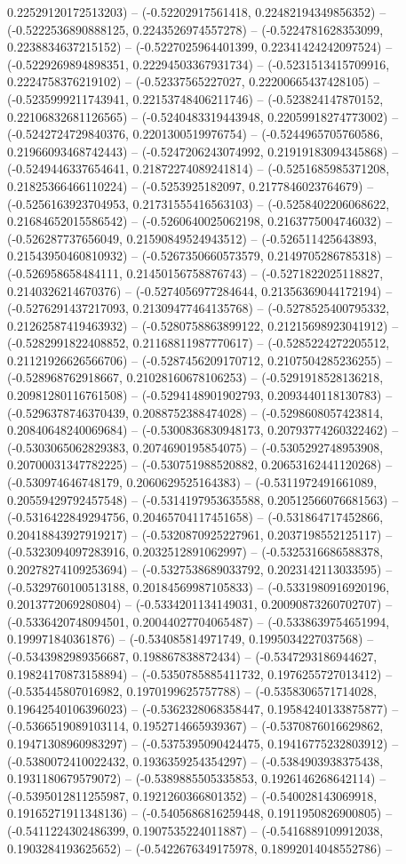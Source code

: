 0.22529120172513203) -- (-0.52202917561418, 0.22482194349856352) -- (-0.5222536890888125, 0.2243526974557278) -- (-0.5224781628353099, 0.2238834637215152) -- (-0.5227025964401399, 0.22341424242097524) -- (-0.5229269894898351, 0.22294503367931734) -- (-0.5231513415709916, 0.2224758376219102) -- (-0.52337565227027, 0.22200665437428105) -- (-0.5235999211743941, 0.22153748406211746) -- (-0.523824147870152, 0.22106832681126565) -- (-0.5240483319443948, 0.22059918274773002) -- (-0.5242724729840376, 0.2201300519976754) -- (-0.5244965705760586, 0.21966093468742443) -- (-0.5247206243074992, 0.21919183094345868) -- (-0.5249446337654641, 0.21872274089241814) -- (-0.5251685985371208, 0.21825366466110224) -- (-0.5253925182097, 0.2177846023764679) -- (-0.5256163923704953, 0.21731555416563103) -- (-0.5258402206068622, 0.21684652015586542) -- (-0.5260640025062198, 0.2163775004746032) -- (-0.526287737656049, 0.21590849524943512) -- (-0.526511425643893, 0.21543950460810932) -- (-0.5267350660573579, 0.2149705286785318) -- (-0.526958658484111, 0.21450156758876743) -- (-0.5271822025118827, 0.2140326214670376) -- (-0.5274056977284644, 0.21356369044172194) -- (-0.5276291437217093, 0.21309477464135768) -- (-0.5278525400795332, 0.21262587419463932) -- (-0.5280758863899122, 0.21215698923041912) -- (-0.5282991822408852, 0.21168811987770617) -- (-0.5285224272205512, 0.21121926626566706) -- (-0.5287456209170712, 0.2107504285236255) -- (-0.528968762918667, 0.21028160678106253) -- (-0.5291918528136218, 0.20981280116761508) -- (-0.5294148901902793, 0.2093440118130783) -- (-0.5296378746370439, 0.2088752388474028) -- (-0.5298608057423814, 0.20840648240069684) -- (-0.5300836830948173, 0.20793774260322462) -- (-0.5303065062829383, 0.2074690195854075) -- (-0.5305292748953908, 0.20700031347782225) -- (-0.530751988520882, 0.20653162441120268) -- (-0.530974646748179, 0.2060629525164383) -- (-0.5311972491661089, 0.20559429792457548) -- (-0.5314197953635588, 0.20512566076681563) -- (-0.5316422849294756, 0.20465704117451658) -- (-0.531864717452866, 0.20418843927919217) -- (-0.5320870925227961, 0.2037198552125117) -- (-0.5323094097283916, 0.2032512891062997) -- (-0.5325316686588378, 0.20278274109253694) -- (-0.5327538689033792, 0.2023142113033595) -- (-0.5329760100513188, 0.20184569987105833) -- (-0.5331980916920196, 0.2013772069280804) -- (-0.5334201134149031, 0.20090873260702707) -- (-0.5336420748094501, 0.20044027704065487) -- (-0.5338639754651994, 0.199971840361876) -- (-0.534085814971749, 0.1995034227037568) -- (-0.5343982989356687, 0.198867838872434) -- (-0.5347293186944627, 0.19824170873158894) -- (-0.5350785885411732, 0.1976255727013412) -- (-0.535445807016982, 0.1970199625757788) -- (-0.5358306571714028, 0.19642540106396023) -- (-0.5362328068358447, 0.19584240133875877) -- (-0.5366519089103114, 0.1952714665939367) -- (-0.5370876016629862, 0.19471308960983297) -- (-0.5375395090424475, 0.19416775232803912) -- (-0.5380072410022432, 0.1936359254354297) -- (-0.5384903938375438, 0.1931180679579072) -- (-0.5389885505335853, 0.1926146268642114) -- (-0.5395012811255987, 0.1921260366801352) -- (-0.540028143069918, 0.19165271911348136) -- (-0.5405686816259448, 0.1911950826900805) -- (-0.5411224302486399, 0.1907535224011887) -- (-0.5416889109912038, 0.1903284193625652) -- (-0.5422676349175978, 0.18992014048552786) -- 